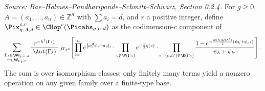 \begin{definition}
  \label{def:pixton_formula_r}
  \textit{Source: Bae--Holmes--Pandharipande--Schmitt--Schwarz, Section 0.2.4.}
  For $g \geq 0$, $A = (a_1,\ldots,a_n) \in \mathbb{Z}^n$ with $\sum a_i = d$, and $r$ a
  positive integer, define $\Pix^{c,r}_{g,A,d} \in \CHop^c(\Picabs_{g,n,d})$ as the
  codimension-$c$ component of
  \[
    \sum_{\substack{\Gamma_\delta \in \GG_{g,n,d} \\ w \in \mathsf{W}_{\Gamma_\delta,r}}}
    \frac{r^{-h^1(\Gamma_\delta)}}{|\Aut(\Gamma_\delta)|}
    \; j_{\Gamma_\delta*}\!\left[
      \prod_{i=1}^n e^{\frac{1}{2}a_i^2 \psi_i + a_i \xi_i}
      \cdot \prod_{v \in \V(\Gamma_\delta)} e^{-\frac{1}{2}\eta(v)}
      \cdot \prod_{e=(h,h') \in \E(\Gamma_\delta)}
        \frac{1 - e^{-\frac{w(h)w(h')}{2}(\psi_h + \psi_{h'})}}{\psi_h + \psi_{h'}}
    \right].
  \]
  The sum is over isomorphism classes; only finitely many terms yield a nonzero operation
  on any given family over a finite-type base.
\end{definition}

